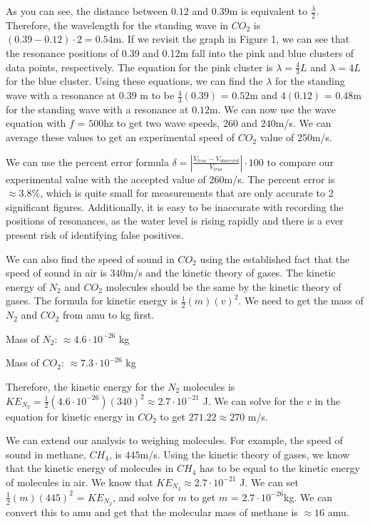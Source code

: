 \documentclass[11pt,twoside]{article}
\begin{document}
As you can see, the distance between $0.12$ and $0.39$m is equivalent to $\frac{\lambda}{2}$. Therefore, the wavelength for the standing wave in $CO_2$ is $(0.39 - 0.12) \cdot 2 = 0.54$m. If we revisit the graph in Figure 1, we can see that the resonance positions of 0.39 and 0.12m fall into the pink and blue clusters of data points, respectively. The equation for the pink cluster is $\lambda = \frac{4}{3}L$ and $\lambda = 4L$ for the blue cluster. Using these equations, we can find the $\lambda$ for the standing wave with a resonance at $0.39$ m to be $\frac{4}{3}(0.39)$ = $0.52$m and $4(0.12)$ = $0.48$m for the standing wave with a resonance at $0.12$m. We can now use the wave equation with $f$ = $500$hz to get two wave speeds, $260$ and $240$m/s. We can average these values to get an experimental speed of $CO_2$ value of $250$m/s. 

We can use the percent error formula 
$\delta = |\frac{V_{true} - V_{observed}}{V_{true}}| \cdot 100$ to compare our experimental value with the accepted value of $260$m/s. The percent error is $\approx 3.8\%$, which is quite small for measurements that are only accurate to 2 significant figures. Additionally, it is easy to be inaccurate with recording the positions of resonances, as the water level is rising rapidly and there is a ever present risk of identifying false positives. 

We can also find the speed of sound in $CO_2$ using the established fact that the speed of sound in air is $340$m/s and the kinetic theory of gases. The kinetic energy of $N_2$ and $CO_2$ molecules should be the same by the kinetic theory of gases. The formula for kinetic energy is $\frac{1}{2}(m)(v)^2$. We need to get the mass of $N_2$ and $CO_2$ from amu to kg first. 

Mass of $N_2$: $\approx 4.6 \cdot 10^{-26}$ kg

Mass of $CO_2$: $\approx 7.3 \cdot 10^{-26}$ kg 

Therefore, the kinetic energy for the $N_2$ molecules is $KE_{N_2} = \frac{1}{2}(4.6 \cdot 10^{-26})(340)^2 \approx 2.7 \cdot 10^{-21}$ J. We can solve for the $v$ in the equation for kinetic energy in $CO_2$ to get $271.22 \approx 270$ m/s.

We can extend our analysis to weighing molecules. For example, the speed of sound in methane, $CH_4$, is $445$m/s. Using the kinetic theory of gases, we know that the kinetic energy of molecules in $CH_4$ has to be equal to the kinetic energy of molecules in air. We know that $KE_{N_2} \approx 2.7 \cdot 10^{-21}$ J. We can set $\frac{1}{2}(m)(445)^2$ = $KE_{N_2}$, and solve for $m$ to get $m$ = $2.7 \cdot 10^{-26}$kg. We can convert this to amu and get that the molecular mass of methane is $\approx 16$ amu.
\end{document}
